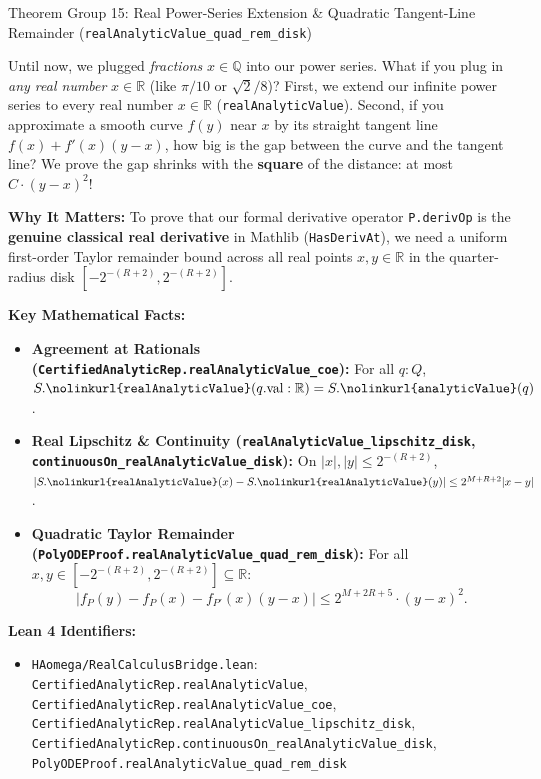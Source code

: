 \documentclass[11pt,a4paper]{article}
\newcommand{\Q}{\ensuremath{\mathbb{Q}}}
\newcommand{\R}{\ensuremath{\mathbb{R}}}
\newcommand{\lean}[1]{\texttt{\nolinkurl{#1}}}
\begin{document}
\begin{thmcard}{Theorem Group 15: Real Power-Series Extension \& Quadratic Tangent-Line Remainder (\lean{realAnalyticValue\_quad\_rem\_disk})}
\begin{eli5box}
Until now, we plugged \emph{fractions} $x \in \Q$ into our power series. What if you plug in \emph{any real number} $x \in \R$ (like $\pi/10$ or $\sqrt{2}/8$)? First, we extend our infinite power series to every real number $x \in \R$ (\lean{realAnalyticValue}). Second, if you approximate a smooth curve $f(y)$ near $x$ by its straight tangent line $f(x) + f'(x)(y-x)$, how big is the gap between the curve and the tangent line? We prove the gap shrinks with the \textbf{square} of the distance: at most $C \cdot (y-x)^2$!
\end{eli5box}

\textbf{Why It Matters:}
To prove that our formal derivative operator \lean{P.derivOp} is the \textbf{genuine classical real derivative} in Mathlib (\lean{HasDerivAt}), we need a uniform first-order Taylor remainder bound across all real points $x, y \in \R$ in the quarter-radius disk $[-2^{-(R+2)}, 2^{-(R+2)}]$.

\textbf{Key Mathematical Facts:}
\begin{itemize}
  \item \textbf{Agreement at Rationals (\lean{CertifiedAnalyticRep.realAnalyticValue_coe}):} For all $q : Q$, $S.\lean{realAnalyticValue}(q.\mathrm{val} : \R) = S.\lean{analyticValue}(q)$.
  \item \textbf{Real Lipschitz \& Continuity (\lean{realAnalyticValue_lipschitz_disk}, \lean{continuousOn_realAnalyticValue_disk}):} On $|x|, |y| \le 2^{-(R+2)}$, $|S.\lean{realAnalyticValue}(x) - S.\lean{realAnalyticValue}(y)| \le 2^{M+R+2}|x - y|$.
  \item \textbf{Quadratic Taylor Remainder (\lean{PolyODEProof.realAnalyticValue_quad_rem_disk}):} For all $x, y \in [-2^{-(R+2)}, 2^{-(R+2)}] \subseteq \R$:
  \[
    \bigl|f_P(y) - f_P(x) - f_{P'}(x)(y - x)\bigr| \le 2^{M + 2R + 5} \cdot (y - x)^2.
  \]
\end{itemize}

\textbf{Lean 4 Identifiers:}
\begin{itemize}
  \item \lean{HAomega/RealCalculusBridge.lean}: \lean{CertifiedAnalyticRep.realAnalyticValue}, \lean{CertifiedAnalyticRep.realAnalyticValue_coe}, \lean{CertifiedAnalyticRep.realAnalyticValue_lipschitz_disk}, \lean{CertifiedAnalyticRep.continuousOn_realAnalyticValue_disk}, \lean{PolyODEProof.realAnalyticValue_quad_rem_disk}
\end{itemize}
\end{thmcard}
\end{document}
